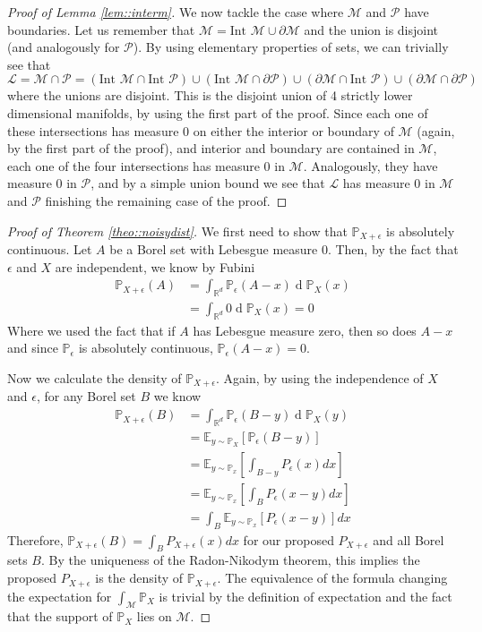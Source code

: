 \documentclass{article} %
\newcommand\EE{\mathbb{E}}
\newcommand\manP{\mathcal{P}}
\newcommand\manM{\mathcal{M}}
\newcommand\Int{\text{Int }}
\newcommand\PP{\mathbb{P}}
\newcommand\RR{\mathbb{R}}
\renewcommand{\d}[1]{\ensuremath{\operatorname{d}\!{#1}}}
\theoremstyle{definition}
\begin{document}
\begin{appendices}
\begin{proof}[Proof of Lemma \autoref{lem::interm}]
We now tackle the case where $\manM$ and $\manP$ have boundaries. Let us remember
that $\manM = \Int \manM \cup \partial \manM$ and the union is disjoint (and analogously
for $\manP$). By using elementary properties of sets, we can trivially see that
$$ \mathcal{L} = \manM \cap \manP = (\Int \manM \cap \Int \manP) \cup
(\Int \manM \cap \partial \manP) \cup
(\partial \manM \cap \Int \manP) \cup
(\partial \manM \cap \partial \manP) $$
where the unions are disjoint. This is the disjoint union of 4 strictly lower dimensional
manifolds, by using the first part of the proof. Since each one of these intersections
has measure 0 on either the interior or boundary of $\manM$ (again, by the first part of the proof), 
and interior and boundary are contained in $\manM$, each one of the four intersections has
measure 0 in $\manM$. Analogously, they have measure 0 in $\manP$, and by a simple union bound
we see that $\mathcal{L}$ has measure 0 in $\manM$ and $\manP$ finishing the remaining case
of the proof.
\end{proof}
\begin{proof}[Proof of Theorem \autoref{theo::noisydist}]
 We first need to show that $\PP_{X+\epsilon}$ is absolutely continuous. Let $A$ be a Borel set
with Lebesgue measure 0. Then, by the fact that $\epsilon$ and $X$ are independent, we know by
Fubini
\begin{align*}
  \PP_{X+\epsilon}(A) &= \int_{\RR^d} \PP_\epsilon(A - x) \d \PP_X(x) \\
&= \int_{\RR^d} 0 \d \PP_X(x) = 0
\end{align*}
Where we used the fact that if $A$ has Lebesgue measure zero, then so does $A-x$ and since
$\PP_\epsilon$ is absolutely continuous, $\PP_\epsilon(A-x) = 0$.

Now we calculate the density of $\PP_{X+\epsilon}$. Again, by using the independence of $X$ and
$\epsilon$, for any Borel set $B$ we know
\begin{align*}
  \PP_{X + \epsilon}(B) &= \int_{\RR^d} \PP_\epsilon(B - y) \d \PP_X(y) \\
                        &= \EE_{y \sim \PP_X} \left[\PP_\epsilon(B-y)\right] \\
                        &= \EE_{y \sim \PP_x} \left[\int_{B-y} P_\epsilon(x) dx \right] \\
&= \EE_{y \sim \PP_x} \left[ \int_B P_\epsilon(x-y) dx \right] \\
&= \int_B \EE_{y \sim \PP_x} \left[ P_\epsilon(x-y) \right] dx
\end{align*}
Therefore, $\PP_{X + \epsilon}(B) = \int_B P_{X+\epsilon}(x) dx$ for our proposed $P_{X + \epsilon}$
and all Borel sets $B$. By the uniqueness of the Radon-Nikodym theorem,
this implies the proposed $P_{X + \epsilon}$
is the density of $\PP_{X+\epsilon}$.
The equivalence of the formula changing the expectation
for $\int_\manM \PP_X$ is trivial by the definition of expectation and the fact that
the support of $\PP_X$ lies on $\manM$.
\end{proof}


\end{appendices}
\end{document}
